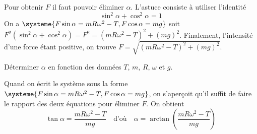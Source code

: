 
\begin{corrige}
	Pour obtenir $F$ il faut pouvoir éliminer $\alpha$. L'astuce consiste à utiliser l'identité
	\[\sin^2\alpha+\cos^2\alpha=1\]
	On a $\systeme{F\sin\alpha=mR\omega^2-T,F\cos\alpha=mg}$ soit $F^2(\sin^2\alpha+\cos^2\alpha)=F^2=\left(mR\omega^2-T\right)^2+(mg)^2$. Finalement, l'intensité d'une force étant positive, on trouve $F=\sqrt{\left(mR\omega^2-T\right)^2+(mg)^2}$.
\end{corrige}



\begin{enonce}
Déterminer $\alpha$ en fonction des données $T$, $m$, $R$, $\omega$ et $g$.
\end{enonce}


\begin{corrige}
	Quand on écrit le système sous la forme $\systeme{F\sin\alpha=mR\omega^2-T,F\cos\alpha=mg}$, on s'aperçoit qu'il suffit de faire le rapport des deux équations pour éliminer $F$. On obtient 
	\[
		\tan\alpha=\frac{mR\omega^2-T}{mg}
		\quad\text{d'où}\quad
		\alpha=\arctan{\left(\frac{mR\omega^2-T}{mg}\right)}
	\]
\end{corrige}


\finEntrainement





\hauteurLargeurCadreReponse		{7mm}{2cm}
\initialisationEntrainement


